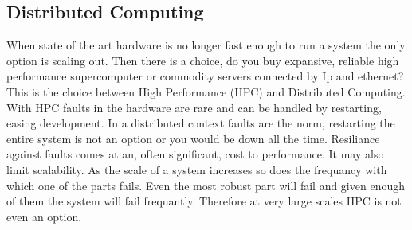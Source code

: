 \subsection{Distributed Computing}
When state of the art hardware is no longer fast enough to run a system the only option is scaling out. Then there is a choice, do you buy expansive, reliable high performance supercomputer or commodity servers connected by Ip and ethernet? This is the choice between High Performance (HPC) and Distributed Computing. With HPC faults in the hardware are rare and can be handled by restarting, easing development. In a distributed context faults are the norm, restarting the entire system is not an option or you would be down all the time. Resiliance against faults comes at an, often significant, cost to performance. It may also limit scalability. As the scale of a system increases so does the frequancy with which one of the parts fails. Even the most robust part will fail and given enough of them the system will fail frequantly. Therefore at very large scales HPC is not even an option. 
